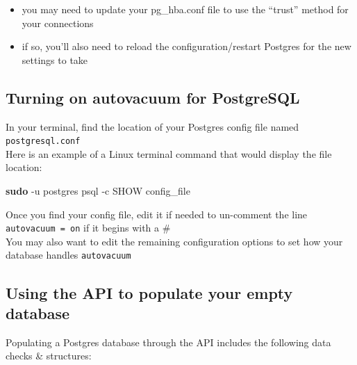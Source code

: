 \documentclass[
]{book}
\newenvironment{Shaded}{\begin{snugshade}}{\end{snugshade}}
\newcommand{\AttributeTok}[1]{\textcolor[rgb]{0.13,0.29,0.53}{#1}}
\newcommand{\FunctionTok}[1]{\textcolor[rgb]{0.13,0.29,0.53}{\textbf{#1}}}
\newcommand{\NormalTok}[1]{#1}
\newcommand{\StringTok}[1]{\textcolor[rgb]{0.31,0.60,0.02}{#1}}
\providecommand{\tightlist}{%
  \setlength{\itemsep}{0pt}\setlength{\parskip}{0pt}}
\begin{document}
\begin{itemize}
\tightlist
\item
  you may need to update your pg\_hba.conf file to use the ``trust'' method for your connections\\
\item
  if so, you'll also need to reload the configuration/restart Postgres for the new settings to take
\end{itemize}

\subsection{Turning on autovacuum for PostgreSQL}\label{turning-on-autovacuum-for-postgresql}

In your terminal, find the location of your Postgres config file named \texttt{postgresql.conf}\\
Here is an example of a Linux terminal command that would display the file location:

\begin{Shaded}
\begin{Highlighting}[]
\FunctionTok{sudo} \AttributeTok{{-}u}\NormalTok{ postgres psql }\AttributeTok{{-}c} \StringTok{\textquotesingle{}SHOW config\_file\textquotesingle{}}
\end{Highlighting}
\end{Shaded}

Once you find your config file, edit it if needed to un-comment the line \texttt{autovacuum\ =\ on} if it begins with a \#\\
You may also want to edit the remaining configuration options to set how your database handles \texttt{autovacuum}

\subsection{Using the API to populate your empty database}\label{using-the-api-to-populate-your-empty-database}

Populating a Postgres database through the API includes the following data checks \& structures:
\end{document}
